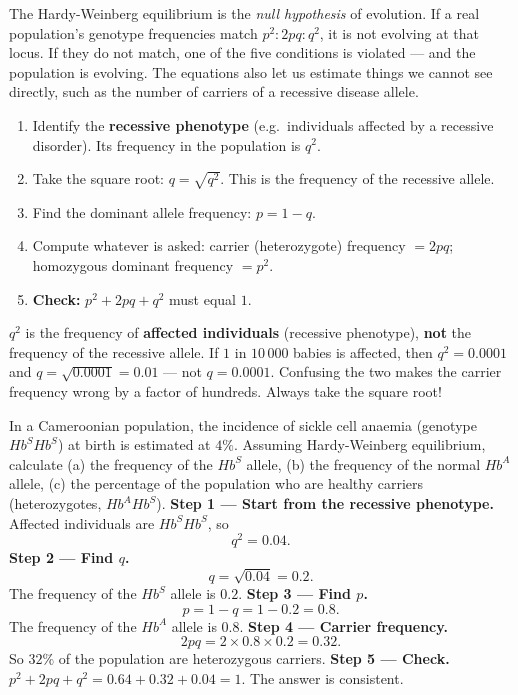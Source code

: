 \documentclass[11pt]{article}
\newcounter{popsec}
\newcounter{popsub}
\newcommand{\courssub}[1]{%
  \stepcounter{popsub}%
  \par\vspace{9pt}\noindent{\popxbold\fontsize{11.5}{13}\selectfont\color{popink}{\color{poporange}\thepopsec.\thepopsub}\hspace{6pt}#1}\par\nopagebreak\vspace{4pt}
}
\begin{document}
\begin{aretenir}
The Hardy-Weinberg equilibrium is the \emph{null hypothesis} of evolution. If a real population's genotype frequencies match $p^2 : 2pq : q^2$, it is not evolving at that locus. If they do not match, one of the five conditions is violated --- and the population is evolving. The equations also let us estimate things we cannot see directly, such as the number of carriers of a recessive disease allele.
\end{aretenir}

\courssub{Solving Hardy-Weinberg Problems}

\begin{methode}
\begin{enumerate}
\item Identify the \textbf{recessive phenotype} (e.g.\ individuals affected by a recessive disorder). Its frequency in the population is $q^2$.
\item Take the square root: $q = \sqrt{q^2}$. This is the frequency of the recessive allele.
\item Find the dominant allele frequency: $p = 1 - q$.
\item Compute whatever is asked: carrier (heterozygote) frequency $= 2pq$; homozygous dominant frequency $= p^2$.
\item \textbf{Check:} $p^2 + 2pq + q^2$ must equal $1$.
\end{enumerate}
\end{methode}

\begin{attention}
$q^2$ is the frequency of \textbf{affected individuals} (recessive phenotype), \textbf{not} the frequency of the recessive allele. If $1$ in $10\,000$ babies is affected, then $q^2 = 0.0001$ and $q = \sqrt{0.0001} = 0.01$ --- not $q = 0.0001$. Confusing the two makes the carrier frequency wrong by a factor of hundreds. Always take the square root!
\end{attention}

\begin{exoresolu}
In a Cameroonian population, the incidence of sickle cell anaemia (genotype $Hb^S Hb^S$) at birth is estimated at $4\%$. Assuming Hardy-Weinberg equilibrium, calculate (a) the frequency of the $Hb^S$ allele, (b) the frequency of the normal $Hb^A$ allele, (c) the percentage of the population who are healthy carriers (heterozygotes, $Hb^A Hb^S$).
\tcblower
\textbf{Step 1 --- Start from the recessive phenotype.} Affected individuals are $Hb^S Hb^S$, so
\[ q^2 = 0.04. \]
\textbf{Step 2 --- Find $q$.}
\[ q = \sqrt{0.04} = 0.2. \]
The frequency of the $Hb^S$ allele is $0.2$.
\textbf{Step 3 --- Find $p$.}
\[ p = 1 - q = 1 - 0.2 = 0.8. \]
The frequency of the $Hb^A$ allele is $0.8$.
\textbf{Step 4 --- Carrier frequency.}
\[ 2pq = 2 \times 0.8 \times 0.2 = 0.32. \]
So $32\%$ of the population are heterozygous carriers.
\textbf{Step 5 --- Check.} $p^2 + 2pq + q^2 = 0.64 + 0.32 + 0.04 = 1$. The answer is consistent.
\end{exoresolu}
\end{document}
